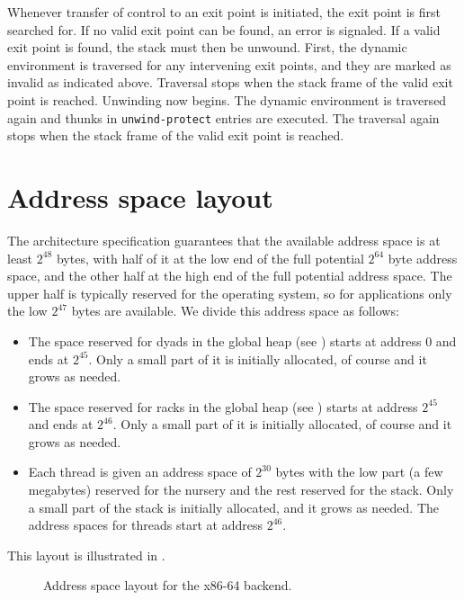 Whenever transfer of control to an exit point is initiated, the exit
point is first searched for.  If no valid exit point can be found, an
error is signaled.  If a valid exit point is found, the stack must
then be unwound.  First, the dynamic environment is traversed for any
intervening exit points, and they are marked as invalid as indicated
above.  Traversal stops when the stack frame of the valid exit point
is reached.  Unwinding now begins.  The dynamic environment is
traversed again and thunks in \texttt{unwind-protect} entries are
executed.  The traversal again stops when the stack frame of the valid
exit point is reached.

\section{Address space layout}

The architecture specification guarantees that the available address
space is at least $2^{48}$ bytes, with half of it at the low end of
the full potential $2^{64}$ byte address space, and the other half at
the high end of the full potential address space.  The upper half is
typically reserved for the operating system, so for applications only
the low $2^{47}$ bytes are available.  We divide this address space as
follows:

\begin{itemize}
\item The space reserved for dyads in the global heap (see
  ) starts at address $0$ and ends at
  $2^{45}$.  Only a small part of it is initially allocated, of course
  and it grows as needed.
\item The space reserved for racks in the global heap (see
  ) starts at address $2^{45}$ and ends at
  $2^{46}$.  Only a small part of it is initially allocated, of course
  and it grows as needed.
\item Each thread is given an address space of $2^{30}$ bytes with the
  low part (a few megabytes) reserved for the nursery and the rest
  reserved for the stack.  Only a small part of the stack is initially
  allocated, and it grows as needed.  The address spaces for threads
  start at address $2^{46}$.
\end{itemize}

This layout is illustrated in .

\begin{figure}
\begin{center}
\end{center}
\caption{\label{fig-address-space-x86-64}
Address space layout for the x86-64 backend.}
\end{figure}

